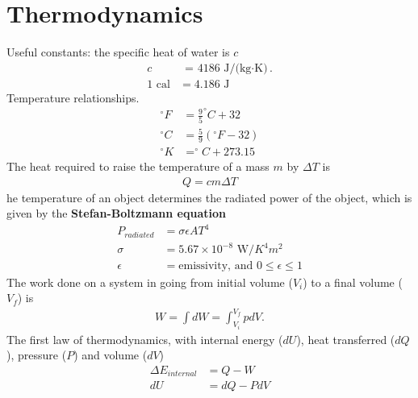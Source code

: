 \chapter{Thermodynamics}
\thispagestyle{fancy}
\begin{multicols}{2}
Useful constants: the specific heat of water is $c$
\begin{align}
c &\textrm{ = 4186 J/(kg$\cdot$K)}. \\
1 \textrm{ cal} &= 4.186 \textrm{ J}
\end{align}
Temperature relationships.
\begin{align}
^\circ F &= \frac{9}{5}^\circ C + 32 \\
 ^\circ C &= \frac{5}{9}(^\circ F - 32) \\
 ^\circ K &= ^\circ C + 273.15
\end{align}
The heat required to raise the temperature of a mass $m$ by $\Delta T$ is
\begin{align}
Q=cm\Delta T
\end{align}he temperature of an object determines the radiated power of the object, which is given by the \textbf{Stefan-Boltzmann equation}
\begin{align}
P_{radiated} &=\sigma \epsilon A T^4 \\
\sigma &= 5.67 \times 10^{-8} \textrm{ W/$K^4m^2$} \\
\epsilon &= \textrm{emissivity, and }0 \leq \epsilon \leq 1
\end{align}
The work done on a system in going from initial volume ($V_i$) to a final volume ($V_f$) is
\begin{align}
W=\int dW = \int_{V_i}^{V_f} pdV.
\end{align}
The first law of thermodynamics, with internal energy ($dU$), heat transferred ($dQ$), pressure ($P$) and volume ($dV$)
\begin{align}
\Delta E_{internal}&=Q-W \\
dU &= dQ - PdV
\end{align}


\end{multicols}

